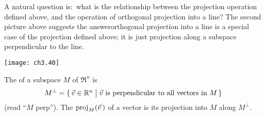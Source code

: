 A natural question is:~what is the relationship between the projection 
operation defined above, and the operation of orthogonal projection
into a line? 
The second picture above suggests the answer\Dash orthogonal projection into
a line is a special case of the projection defined above; it is just 
projection along a subspace perpendicular to the line.
\begin{center}  \small
  \texttt{[image: ch3.40]}
\end{center}

\begin{definition} \label{def:OrthComp}
The %
of a subspace \( M \) of $\Re^n$ is
\begin{equation*}
  M^\perp=\set{\vec{v}\in\Re^n\suchthat
                 \vec{v} \text{ is perpendicular to all vectors in }M}
\end{equation*}
(read ``\( M \) perp'').
The 
%
 \( \proj{\vec{v}\,}{M} \) 
of a vector is its projection into $M$ along \( M^\perp \).
\end{definition}



